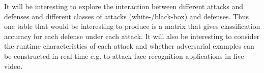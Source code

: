 \documentclass{article}
\begin{document}
It will be interesting to explore the interaction between different attacks and defenses and different classes of attacks (white-/black-box) and defenses. Thus one table that would be interesting to produce is a matrix that gives classification accuracy for each defense under each attack. It will also be interesting to consider the runtime characteristics of each attack and whether adversarial examples can be constructed in real-time e.g. to attack face recognition applications in live video.



\end{document}
